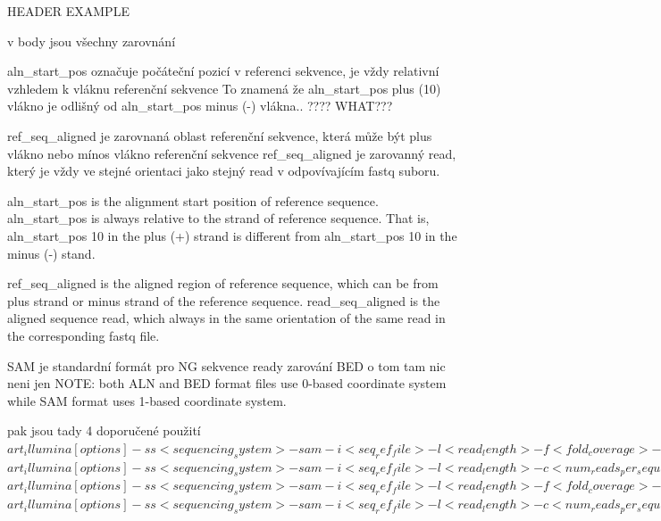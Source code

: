 \documentclass[czech,DP]{thesiskiv}
\begin{document}
		HEADER EXAMPLE

		
v body jsou všechny zarovnání 
	    
	    aln\_start\_pos označuje počáteční pozicí v referenci sekvence, je vždy relativní vzhledem k vláknu referenční sekvence
	    To znamená že aln\_start\_pos plus (10) vlákno je odlišný od  aln\_start\_pos minus (-) vlákna.. ???? WHAT???
	    
		ref\_seq\_aligned je zarovnaná oblast referenční sekvence, která může být plus vlákno nebo mínos vlákno referenční sekvence
		ref\_seq\_aligned je zarovanný read, který je vždy ve stejné orientaci jako stejný read v odpovívajícím fastq suboru.  
		
		
			    
	    
	       	
		aln\_start\_pos is the alignment start position of reference sequence. aln\_start\_pos is always relative to the strand of reference sequence. That is, aln\_start\_pos 10 in the plus (+) strand is different from aln\_start\_pos 10 in the minus (‐) stand.  
	
		ref\_seq\_aligned is the aligned region of reference sequence, which can be from plus strand or minus strand of the reference sequence. 
		read\_seq\_aligned is the aligned sequence read, which always in the same orientation of the same read in the corresponding fastq file. 

SAM je standardní formát pro NG sekvence ready zarování
BED o tom tam nic neni jen 
NOTE: both ALN and BED format files use 0-based coordinate system while SAM format uses 1-based coordinate system.

pak jsou tady 4 doporučené použití
$art_illumina [options] -ss <sequencing_system> -sam -i <seq_ref_file> -l <read_length> -f <fold_coverage> -o <outfile_prefix>$
$art_illumina [options] -ss <sequencing_system> -sam -i <seq_ref_file> -l <read_length> -c <num_reads_per_sequence> -o <outfile_prefix>$
$art_illumina [options] -ss <sequencing_system> -sam -i <seq_ref_file> -l <read_length> -f <fold_coverage> -m <mean_fragsize> -s <std_fragsize> -o <outfile_prefix>$
$art_illumina [options] -ss <sequencing_system> -sam -i <seq_ref_file> -l <read_length> -c <num_reads_per_sequence> -m <mean_fragsize> -s <std_fragsize> -o <outfile_prefix>$
\end{document}
